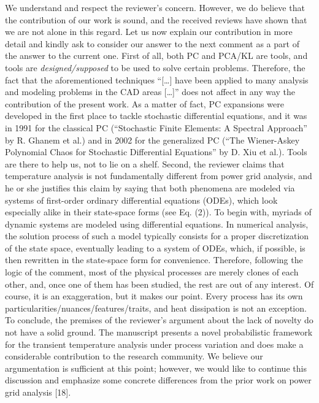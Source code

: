 \begin{authors}
We understand and respect the reviewer’s concern.
However, we do believe that the contribution of our work is sound, and the received reviews have shown that we are not alone in this regard.
Let us now explain our contribution in more detail and kindly ask to consider our answer to the next comment as a part of the answer to the current one.
First of all, both PC and PCA/KL are tools, and tools are \emph{designed/supposed} to be used to solve certain problems.
Therefore, the fact that the aforementioned techniques ``[\ldots] have been applied to many analysis and modeling problems in the CAD areas [\ldots]'' does not affect in any way the contribution of the present work.
As a matter of fact, PC expansions were developed in the first place to tackle stochastic differential equations, and it was in 1991 for the classical PC (``Stochastic Finite Elements: A Spectral Approach'' by R. Ghanem et al.) and in 2002 for the generalized PC (``The Wiener-Askey Polynomial Chaos for Stochastic Differential Equations'' by D. Xiu et al.).
Tools are there to help us, not to lie on a shelf.
Second, the reviewer claims that temperature analysis is not fundamentally different from power grid analysis, and he or she justifies this claim by saying that both phenomena are modeled via systems of first-order ordinary differential equations (ODEs), which look especially alike in their state-space forms (see Eq. (2)).
To begin with, myriads of dynamic systems are modeled using differential equations.
In numerical analysis, the solution process of such a model typically consists for a proper discretization of the state space, eventually leading to a system of ODEs, which, if possible, is then rewritten in the state-space form for convenience.
Therefore, following the logic of the comment, most of the physical processes are merely clones of each other, and, once one of them has been studied, the rest are out of any interest.
Of course, it is an exaggeration, but it makes our point.
Every process has its own particularities/nuances/features/traits, and heat dissipation is not an exception.
To conclude, the premises of the reviewer’s argument about the lack of novelty do not have a solid ground.
The manuscript presents a novel probabilistic framework for the transient temperature analysis under process variation and does make a considerable contribution to the research community.
We believe our argumentation is sufficient at this point; however, we would like to continue this discussion and emphasize some concrete differences from the prior work on power grid analysis [18].

\end{authors}
